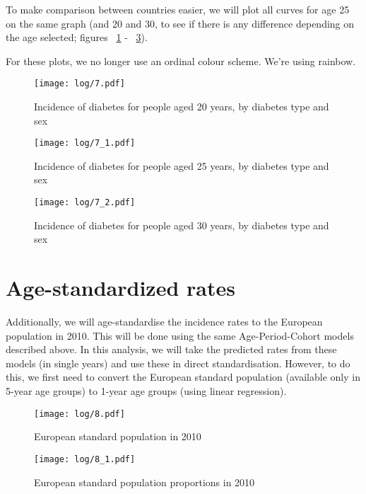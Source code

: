 \documentclass[11pt]{article}
\begin{document}
To make comparison between countries easier, we will plot all curves for age 25 on the same graph 
(and 20 and 30, to see if there is any difference depending on the age selected; figures ~\ref{agespec20} - ~\ref{agespec30}).

For these plots, we no longer use an ordinal colour scheme. We're using rainbow.

\color{Blue4}
\begin{stlog}\end{stlog}
\begin{figure}
    \centering
    \texttt{[image: log/7.pdf]}
    \caption{Incidence of diabetes for people aged 20 years, by diabetes type and sex}
    \label{agespec20}
\end{figure}
\begin{figure}
    \centering
    \texttt{[image: log/7\_1.pdf]}
    \caption{Incidence of diabetes for people aged 25 years, by diabetes type and sex}
    \label{agespec25}
\end{figure}
\begin{figure}
    \centering
    \texttt{[image: log/7\_2.pdf]}
    \caption{Incidence of diabetes for people aged 30 years, by diabetes type and sex}
    \label{agespec30}
\end{figure}
\begin{stlog}\end{stlog}
\color{black}

\clearpage
\section{Age-standardized rates}


Additionally, we will age-standardise the incidence rates to the European population in 2010. 
This will be done using the same Age-Period-Cohort models described above. In this analysis, we will take
the predicted rates from these models (in single years) and use these in direct standardisation. However,
to do this, we first need to convert the European standard population (available only in 5-year age groups)
to 1-year age groups (using linear regression).

\color{Blue4}
\begin{figure}
    \centering
    \texttt{[image: log/8.pdf]}
    \caption{European standard population in 2010}
    \label{ESP2010N}
\end{figure}
\begin{figure}
    \centering
    \texttt{[image: log/8\_1.pdf]}
    \caption{European standard population proportions in 2010}
    \label{ESP2010P}
\end{figure}
\begin{stlog}\end{stlog}
\color{black}
\end{document}
